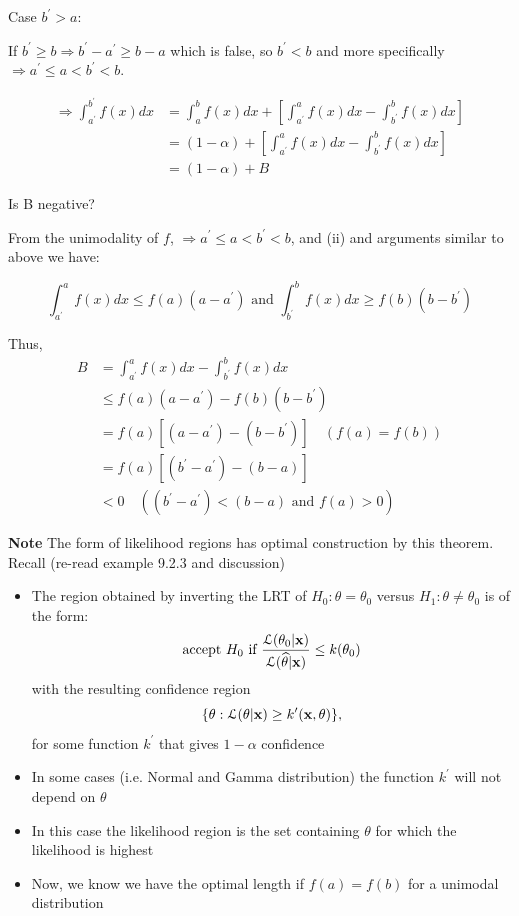 \documentclass[11pt,]{article}
\def\bx{{\bf x}}
\def\thetahat{{\widehat\theta}}
\def\Lsc{{\cal L}}
\begin{document}
Case \(b^\prime> a:\)

If \(b^\prime\geq b \Rightarrow b^\prime- a^\prime\geq b-a\) which is
false, so \(b^\prime< b\) and more specifically
\(\Rightarrow a^\prime\leq a < b^\prime< b\).

\begin{align*}
\Rightarrow \int_{a^\prime}^{b^\prime}f(x)dx &= \int_{a}^{b}f(x)dx + \left[\int_{a^\prime}^{a}f(x)dx - \int_{b^\prime}^{b}f(x)dx \right] \\
&=(1-\alpha) + \left[\int_{a^\prime}^{a}f(x)dx - \int_{b^\prime}^{b}f(x)dx \right] \\
&= (1-\alpha) + B
\end{align*}

Is B negative?

From the unimodality of \(f\),
\(\Rightarrow a^\prime\leq a < b^\prime< b\), and (ii) and arguments
similar to above we have:

\[\int_{a^\prime}^{a}f(x)dx \leq f(a) (a-a^\prime) \mbox{ and } \int_{b^\prime}^{b}f(x)dx \geq f(b) (b-b^\prime)\]

Thus, \begin{align*}
B &= \int_{a^\prime}^{a}f(x)dx - \int_{b^\prime}^{b}f(x)dx\\
&\leq f(a) (a-a^\prime) - f(b) (b-b^\prime)\\
&= f(a) [ (a-a^\prime) - (b- b^\prime)] \quad (f(a) = f(b))\\
&= f(a) [(b^\prime- a^\prime) - (b-a)]\\
&<0 \quad ((b^\prime- a^\prime) < (b-a) \mbox{ and } f(a) >0)
\end{align*}

\noindent\textbf{Note} The form of likelihood regions has optimal
construction by this theorem. Recall (re-read example 9.2.3 and
discussion)

\begin{itemize}
\item The region obtained by inverting the LRT of $H_0: \theta = \theta_0$ versus $H_1: \theta \neq \theta_0$ is of the form:
$$\mbox{accept } H_0 \mbox{ if } \frac{\Lsc(\theta_0 |\bx)}{\Lsc(\thetahat|\bx)} \leq k(\theta_0)$$
with the resulting confidence region
$$\{\theta : \Lsc(\theta|\bx) \geq k^\prime(\bx,\theta)\},$$
for some function $k^\prime$ that gives $1-\alpha$ confidence
\item In some cases (i.e. Normal and Gamma distribution) the function $k^\prime$ will not depend on $\theta$
\item In this case the likelihood region is the set containing $\theta$ for which the likelihood is highest
\item Now, we know we have the optimal length if $f(a) = f(b)$ for a unimodal distribution
\end{itemize}
\end{document}
